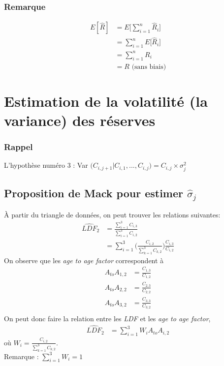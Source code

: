 \documentclass[11pt,french]{report}
\begin{document}
\subsubsection*{Remarque}
\begin{align*}
E[\widehat{R}] &= E \Big[ \sum_{i=1}^{n} \widehat{R}_i \Big] \\
&= \sum_{i=1}^{n} E \Big[  \widehat{R}_i \Big] \\
&= \sum_{i=1}^{n} R_i \\
&= R \text{  (sans biais)}
\end{align*}

\section*{Estimation de la volatilité (la variance) des réserves}
\subsubsection*{Rappel}
L'hypothèse numéro 3 : Var $\Big( C_{i, j+1} | C_{i,1}, ..., C_{i,j}\Big) = C_{i,j} \times \sigma_j^2$

\subsection*{Proposition de Mack pour estimer $\widehat{\sigma}_j$}
À partir du triangle de données, on peut trouver les relations suivantes:
\begin{align*}
\widehat{LDF}_2 &= \frac{\sum_{i=1}^{3} C_{i,3}}{\sum_{i=1}^{3} C_{i,2}} \\
&= \sum_{i=1}^{3} \Bigg( \frac{C_{i,2}}{\sum_{k=1}^{3}C_{k,2}}\Bigg) \frac{C_{i,3}}{C_{i,2}}
\end{align*}
On observe que les \emph{age to age factor} correspondent à
\begin{align*}
A_{to}A_{1,2} &= \frac{C_{1,3}}{C_{1,2}} \\
A_{to}A_{2,2} &= \frac{C_{2,3}}{C_{2,2}} \\
A_{to}A_{3,2} &= \frac{C_{3,3}}{C_{3,2}} \\
\end{align*}
On peut donc faire la relation entre les \emph{LDF} et les \emph{age to age factor},
\begin{align*}
\widehat{LDF}_2 &= \sum_{i=1}^{3} W_i A_{to}A_{i,2}
\end{align*}
où $ W_i = \frac{C_{i,2}}{\sum_{k=1}^{3}C_{k,2}}$.
\\
Remarque : $\sum_{i=1}^{3} W_i= 1$
\end{document}
